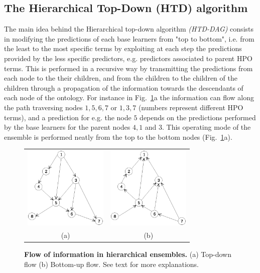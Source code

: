 \documentclass{bioinfo}
\begin{document}
\begin{methods}
\subsection{The Hierarchical Top-Down (HTD) algorithm }
\label{subsec:HTD}
The main idea behind the Hierarchical top-down algorithm {\em (HTD-DAG)} consists in  modifying the predictions of each base learners from "top to bottom", i.e. from the least  to the most specific terms by exploiting at each  step the predictions provided by the less specific predictors, e.g. predictors associated to parent HPO terms. This is performed in a recursive way by transmitting the predictions from each node to the their children, and from the children to the children of the children through a propagation of the information towards the descendants of each node of the ontology. For instance in Fig.~\ref{fig:info-flow}a the information can flow along the path traversing nodes $1, 5, 6, 7$ or $1, 3, 7$ (numbers represent different HPO terms), and a prediction for e.g. the node $5$ depends on the predictions performed by the base learners for the parent nodes $4, 1$ and $3$. This operating mode of the ensemble is performed neatly from the top to the bottom nodes (Fig.~\ref{fig:info-flow}a).

\begin{figure}[!h]
\centering
\begin{tabular}{cc}	
\includegraphics[width=4.0cm]{fig/top-down-flow.eps} &
\includegraphics[width=4.0cm]{fig/bottom-up-flow.eps} \\
(a) & (b)\\ 
\end{tabular}
\vskip -0.1in
\caption{{\bf Flow of information in hierarchical ensembles.} (a) Top-down flow (b) Bottom-up flow. See text for more explanations.}
\label{fig:info-flow}
\vskip -0.1in
\end{figure}


\end{methods}
\end{document}
